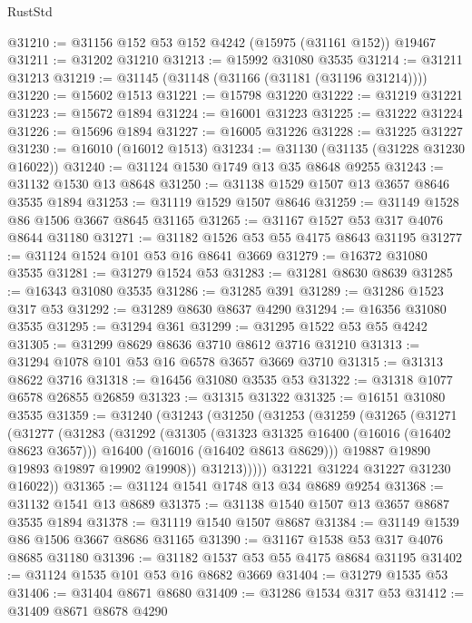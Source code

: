 \begin{lexlean}{RustStd}
\begin{coremodule}
@31210 := @31156 @152 @53 @152 @4242 (@15975 (@31161 @152)) @19467
@31211 := @31202 @31210
@31213 := @15992 @31080 @3535
@31214 := @31211 @31213
@31219 := @31145 (@31148 (@31166 (@31181 (@31196 @31214))))
@31220 := @15602 @1513
@31221 := @15798 @31220
@31222 := @31219 @31221
@31223 := @15672 @1894
@31224 := @16001 @31223
@31225 := @31222 @31224
@31226 := @15696 @1894
@31227 := @16005 @31226
@31228 := @31225 @31227
@31230 := @16010 (@16012 @1513)
@31234 := @31130 (@31135 (@31228 @31230 @16022))
@31240 := @31124 @1530 @1749 @13 @35 @8648 @9255
@31243 := @31132 @1530 @13 @8648
@31250 := @31138 @1529 @1507 @13 @3657 @8646 @3535 @1894
@31253 := @31119 @1529 @1507 @8646
@31259 := @31149 @1528 @86 @1506 @3667 @8645 @31165
@31265 := @31167 @1527 @53 @317 @4076 @8644 @31180
@31271 := @31182 @1526 @53 @55 @4175 @8643 @31195
@31277 := @31124 @1524 @101 @53 @16 @8641 @3669
@31279 := @16372 @31080 @3535
@31281 := @31279 @1524 @53
@31283 := @31281 @8630 @8639
@31285 := @16343 @31080 @3535
@31286 := @31285 @391
@31289 := @31286 @1523 @317 @53
@31292 := @31289 @8630 @8637 @4290
@31294 := @16356 @31080 @3535
@31295 := @31294 @361
@31299 := @31295 @1522 @53 @55 @4242
@31305 := @31299 @8629 @8636 @3710 @8612 @3716 @31210
@31313 := @31294 @1078 @101 @53 @16 @6578 @3657 @3669 @3710
@31315 := @31313 @8622 @3716
@31318 := @16456 @31080 @3535 @53
@31322 := @31318 @1077 @6578 @26855 @26859
@31323 := @31315 @31322
@31325 := @16151 @31080 @3535
@31359 := @31240
    (@31243
      (@31250
        (@31253
          (@31259
            (@31265
              (@31271
                (@31277
                  (@31283
                    (@31292
                      (@31305
                        (@31323 @31325 @16400 (@16016 (@16402 @8623 @3657)))
                        @16400
                        (@16016 (@16402 @8613 @8629)))
                      @19887
                      @19890
                      @19893
                      @19897
                      @19902
                      @19908))
                  @31213)))))
        @31221
        @31224
        @31227
        @31230
        @16022))
@31365 := @31124 @1541 @1748 @13 @34 @8689 @9254
@31368 := @31132 @1541 @13 @8689
@31375 := @31138 @1540 @1507 @13 @3657 @8687 @3535 @1894
@31378 := @31119 @1540 @1507 @8687
@31384 := @31149 @1539 @86 @1506 @3667 @8686 @31165
@31390 := @31167 @1538 @53 @317 @4076 @8685 @31180
@31396 := @31182 @1537 @53 @55 @4175 @8684 @31195
@31402 := @31124 @1535 @101 @53 @16 @8682 @3669
@31404 := @31279 @1535 @53
@31406 := @31404 @8671 @8680
@31409 := @31286 @1534 @317 @53
@31412 := @31409 @8671 @8678 @4290

\end{coremodule}
\end{lexlean}
